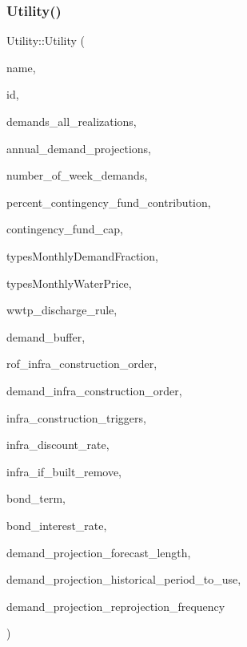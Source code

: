 \subsubsection{\texorpdfstring{Utility()}{Utility()}\hspace{0.1cm}{\footnotesize\ttfamily [2/4]}}
{\footnotesize\ttfamily Utility\+::\+Utility (\begin{DoxyParamCaption}\item[{const char $\ast$}]{name,  }\item[{int}]{id,  }\item[{vector$<$ vector$<$ double $>$$>$ \&}]{demands\+\_\+all\+\_\+realizations,  }\item[{vector$<$ double $>$ \&}]{annual\+\_\+demand\+\_\+projections,  }\item[{int}]{number\+\_\+of\+\_\+week\+\_\+demands,  }\item[{const double}]{percent\+\_\+contingency\+\_\+fund\+\_\+contribution,  }\item[{const double}]{contingency\+\_\+fund\+\_\+cap,  }\item[{const vector$<$ vector$<$ double $>$$>$ \&}]{types\+Monthly\+Demand\+Fraction,  }\item[{const vector$<$ vector$<$ double $>$$>$ \&}]{types\+Monthly\+Water\+Price,  }\item[{Wwtp\+Discharge\+Rule}]{wwtp\+\_\+discharge\+\_\+rule,  }\item[{double}]{demand\+\_\+buffer,  }\item[{const vector$<$ int $>$ \&}]{rof\+\_\+infra\+\_\+construction\+\_\+order,  }\item[{const vector$<$ int $>$ \&}]{demand\+\_\+infra\+\_\+construction\+\_\+order,  }\item[{const vector$<$ double $>$ \&}]{infra\+\_\+construction\+\_\+triggers,  }\item[{double}]{infra\+\_\+discount\+\_\+rate,  }\item[{const vector$<$ vector$<$ int $>$$>$ \&}]{infra\+\_\+if\+\_\+built\+\_\+remove,  }\item[{double}]{bond\+\_\+term,  }\item[{double}]{bond\+\_\+interest\+\_\+rate,  }\item[{int}]{demand\+\_\+projection\+\_\+forecast\+\_\+length,  }\item[{int}]{demand\+\_\+projection\+\_\+historical\+\_\+period\+\_\+to\+\_\+use,  }\item[{int}]{demand\+\_\+projection\+\_\+reprojection\+\_\+frequency }\end{DoxyParamCaption})}



